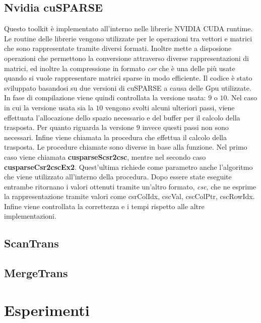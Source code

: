 \documentclass[]{IEEEtran}
\begin{document}
	\subsection{Nvidia cuSPARSE}
	Questo toolkit è implementato all'interno nelle librerie NVIDIA CUDA runtime. Le routine delle librerie vengono utilizzate per le operazioni tra vettori e matrici che sono rappresentate tramite diversi formati. Inoltre mette a disposione operazioni che permettono la conversione attraverso diverse rappresentazioni di matrici, ed inoltre la compressione in formato \textit{csr} che è una delle più usate quando si vuole rappresentare matrici sparse in modo efficiente.\newline	
	Il codice è stato sviluppato basandosi su due versioni di cuSPARSE a causa delle Gpu utilizzate. In fase di compilazione viene quindi controllata la versione usata: $ 9 $ o $ 10 $.\newline
	Nel caso in cui la versione usata sia la $ 10 $ vengono svolti alcuni ulteriori passi, viene effettuata l'allocazione dello spazio necessario e del buffer per il calcolo della trasposta. Per quanto riguarda la versione $ 9 $ invece questi passi non sono necessari.\newline
	Infine viene chiamata la procedura che effettua il calcolo della trasposta. \newline
	Le procedure chiamate sono diverse in base alla funzione. Nel primo caso viene chiamata \textbf{cusparseScsr2csc}, mentre nel secondo caso \textbf{cusparseCsr2cscEx2}. Quest'ultima richiede come parametro anche l'algoritmo che viene utilizzato all'interno della procedura.\newline
	Dopo essere state eseguite entrambe ritornano i valori ottenuti tramite un'altro formato, \textit{csc}, che ne esprime la rappresentazione tramite valori come csrColIdx, cscVal, cscColPtr, cscRowIdx. Infine viene controllata la correttezza e i tempi rispetto alle altre implementazioni.

	\subsection{ScanTrans}
	
	
	\subsection{MergeTrans}
	

\section{Esperimenti}
\label{esperimenti}
	
\end{document}
